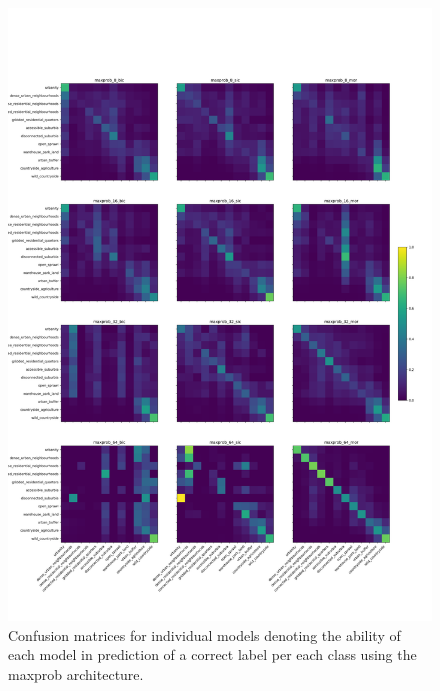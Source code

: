 \begin{figure}
    \centering
    \includegraphics[width=.9\linewidth]{fig/maxprob_cm.png}
    \caption{\footnotesize Confusion matrices for individual models denoting
    the ability of each model in prediction of a correct label per each class
    using the maxprob architecture.}
    \label{fig:maxprob_cm}
\end{figure}



